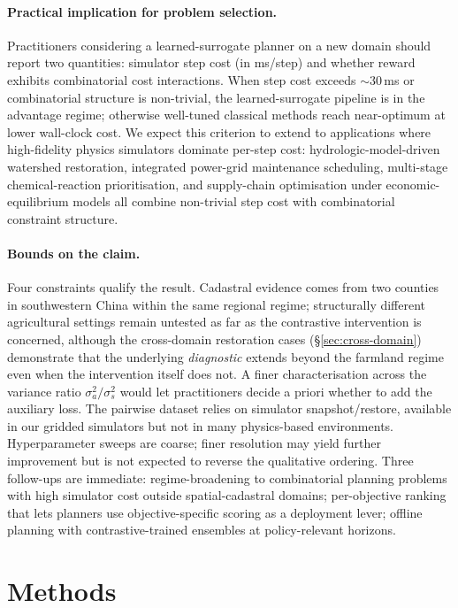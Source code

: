 \documentclass[11pt]{article}
\begin{document}
\paragraph{Practical implication for problem selection.} Practitioners considering a learned-surrogate planner on a new domain should report two quantities: simulator step cost (in ms/step) and whether reward exhibits combinatorial cost interactions. When step cost exceeds $\sim 30$\,ms or combinatorial structure is non-trivial, the learned-surrogate pipeline is in the advantage regime; otherwise well-tuned classical methods reach near-optimum at lower wall-clock cost. We expect this criterion to extend to applications where high-fidelity physics simulators dominate per-step cost: hydrologic-model-driven watershed restoration, integrated power-grid maintenance scheduling, multi-stage chemical-reaction prioritisation, and supply-chain optimisation under economic-equilibrium models all combine non-trivial step cost with combinatorial constraint structure.

\paragraph{Bounds on the claim.} Four constraints qualify the result. Cadastral evidence comes from two counties in southwestern China within the same regional regime; structurally different agricultural settings remain untested as far as the contrastive intervention is concerned, although the cross-domain restoration cases (\S\ref{sec:cross-domain}) demonstrate that the underlying \emph{diagnostic} extends beyond the farmland regime even when the intervention itself does not. A finer characterisation across the variance ratio $\sigma_a^2 / \sigma_s^2$ would let practitioners decide a priori whether to add the auxiliary loss. The pairwise dataset relies on simulator snapshot/restore, available in our gridded simulators but not in many physics-based environments. Hyperparameter sweeps are coarse; finer resolution may yield further improvement but is not expected to reverse the qualitative ordering. Three follow-ups are immediate: regime-broadening to combinatorial planning problems with high simulator cost outside spatial-cadastral domains; per-objective ranking that lets planners use objective-specific scoring as a deployment lever; offline planning with contrastive-trained ensembles at policy-relevant horizons.

\section*{Methods}
\label{sec:methods}
\end{document}
